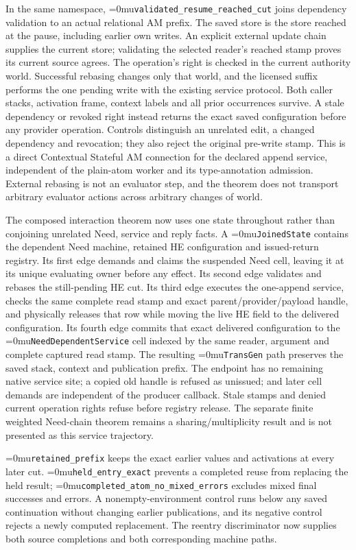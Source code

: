\documentclass[11pt,a4paper]{article}
\newcommand{\name}[1]{\textup{\Urlmuskip=0mu\relax\nolinkurl{#1}}}
\begin{document}
In the same namespace, \name{validated_resume_reached_cut} joins dependency
validation to an actual relational AM prefix. The saved
store is the store reached at the pause, including earlier own writes.
An explicit external update chain supplies the current store; validating the
selected reader's reached stamp proves its current source agrees. The
operation's right is checked in the current authority world. Successful
rebasing changes only that world, and the licensed suffix performs the one
pending write with the existing service protocol. Both caller stacks,
activation frame, context labels and all prior occurrences survive.
A stale dependency or revoked right instead returns the exact saved
configuration before any provider operation. Controls distinguish an
unrelated edit, a changed dependency and revocation; they also reject the
original pre-write stamp. This is a direct Contextual Stateful AM connection
for the declared append service, independent of the plain-atom worker and
its type-annotation admission. External rebasing is not an evaluator step,
and the theorem does not transport arbitrary evaluator actions across
arbitrary changes of world.

The composed interaction theorem now uses one state throughout rather than
conjoining unrelated Need, service and reply facts.  A \name{JoinedState}
contains the dependent Need machine, retained HE configuration and issued-return
registry.  Its first edge demands and claims the suspended Need cell, leaving it
at its unique evaluating owner before any effect.  Its second edge validates and
rebases the still-pending HE cut.  Its third edge executes the one-append service,
checks the same complete read stamp and exact parent/provider/payload handle, and
physically releases that row while moving the live HE field to the delivered
configuration.  Its fourth edge commits that exact delivered configuration to
the \name{NeedDependentService} cell indexed by the
same reader, argument and complete captured read stamp.  The resulting
\name{TransGen} path preserves the
saved stack, context and publication prefix.  The endpoint has no remaining
native service site; a copied old handle is refused as unissued; and later cell
demands are independent of the producer callback.  Stale stamps and denied
current operation rights refuse before registry release.  The separate finite weighted Need-chain theorem remains a
sharing/multiplicity result and is not presented as this service trajectory.

\name{retained_prefix} keeps the exact earlier values and activations at every
later cut. \name{held_entry_exact} prevents a completed reuse from replacing
the held result; \name{completed_atom_no_mixed_errors} excludes mixed final
successes and errors. A nonempty-environment control runs below any saved
continuation without changing earlier publications, and its negative control
rejects a newly computed replacement. The reentry discriminator now supplies
both source completions and both corresponding machine paths.
\end{document}
